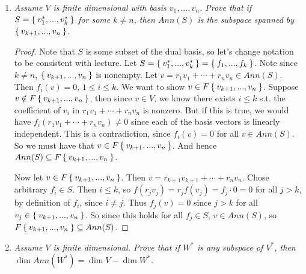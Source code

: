 \documentclass[10pt,oneside,reqno]{amsart}
\theoremstyle{plain}
\theoremstyle{definition}
\theoremstyle{remark}
\newcommand{\sub}{\subseteq}
\newcommand{\bb}{\vspace{3mm}}
\begin{document}
\begin{enumerate}[label=\arabic*.]
\begin{enumerate}
\begin{proof}
 
 
 
 Now let $v \in Ann(S)$. Then since $B_S \sub S$, we know $v \in Ann(B_S)$. Then 
 $$
 FS \sub FB_S = F\Set{f_1,...,f_k} = \Set{r_1f_1 + \cdots + r_kf_k:r_i \in F, f_i \in B_S}.
 $$
  Then $f_i(v) = 0$ for all $i$ since they are in $B_S$, and $r_i \cdot 0 = 0$, so $v \in Ann(FB_S) \sub Ann(FS)$ since $FS \sub FB_S$. Hence $Ann(S) \sub Ann(FS)$, and so they are equal. 
\end{proof}

\bb

\item \textit{Assume $V$ is finite dimensional with basis $v_1,...,v_n$. Prove that if $S = \Set{v_1^*,...,v_k^*}$ for some $k \neq n$, then $Ann(S)$ is the subspace spanned by $\Set{v_{k + 1},...,v_n}$. }

\bb

\begin{proof}
Note that $S$ is some subset of the dual basis, so let's change notation to be consistent with lecture. Let $S = \Set{v_1^*,...,v_k^*} = \Set{f_1,...,f_k}$. Note since $k \neq n$, $\Set{v_{k + 1},...,v_n}$ is nonempty. Let $v = r_1v_1 + \cdots + r_nv_n \in Ann(S)$. Then $f_i(v) = 0$, $1 \leq i \leq k$. We want to show $v \in F\Set{v_{k + 1},...,v_n}$. Suppose $v \notin  F\Set{v_{k + 1},...,v_n}$, then since $v \in V$, we know there exists $i \leq k$ s.t. the coefficient of $v_i$ in $r_1v_1 + \cdots + r_nv_n$ is nonzero. But if this is true, we would have $f_i(r_1v_1 + \cdots + r_nv_n) \neq 0$ since each of the basis vectors is linearly independent. This is a contradiction, since $f_i(v) = 0$ for all $v \in Ann(S)$. So we must have that $v \in  F\Set{v_{k + 1},...,v_n}$. And hence $Ann(S) \sub F\Set{v_{k + 1},...,v_n}$. 

Now let $v \in F\Set{v_{k + 1},...,v_n}$. Then $v = r_{k + 1}v_{k + 1} + \cdots + r_nv_n$. Chose arbitrary $f_i \in S$. Then $i \leq k$, so $f(r_jv_j) = r_jf(v_j) = f_j\cdot 0 = 0$ for all $j > k$, by definition of $f_i$, since $i \neq j$. Thus $f_j(v) = 0$ since $j > k$ for all $v_j \in \Set{v_{k + 1},...,v_n}$. So since this holds for all $f_j \in S$, $v \in Ann(S)$, so $F\Set{v_{k + 1},...,v_n} \sub Ann(S)$. 
\end{proof}

\bb

\item \textit{Assume $V$ is finite dimensional. Prove that if $W^*$ is any subspace of $V^*$, then $\dim Ann(W^*) = \dim V - \dim W^*$. }

\bb


\end{enumerate}
\end{enumerate}
\end{document}
